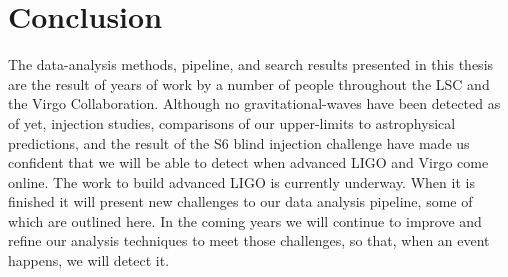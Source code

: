 %
%
%

\section{Conclusion}

The data-analysis methods, pipeline, and search results presented in this thesis are the result of years of work by a number of people throughout the \ac{LSC} and the Virgo Collaboration. Although no gravitational-waves have been detected as of yet, injection studies, comparisons of our upper-limits to astrophysical predictions, and the result of the \ac{S6} blind injection challenge have made us confident that we will be able to detect when advanced \ac{LIGO} and Virgo come online. The work to build advanced \ac{LIGO} is currently underway. When it is finished it will present new challenges to our data analysis pipeline, some of which are outlined here. In the coming years we will continue to improve and refine our analysis techniques to meet those challenges, so that, when an event happens, we will detect it.
